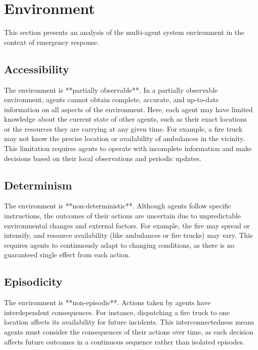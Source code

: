 \section{Environment}
\label{sec:environment}

This section presents an analysis of the multi-agent system environment in the context of emergency response. 


\subsection{Accessibility}

The environment is **partially observable**. In a partially observable environment, agents cannot obtain complete, accurate,
and up-to-date information on all aspects of the environment. Here, each agent may have limited knowledge about the current state of other agents,
such as their exact locations or the resources they are carrying at any given time. For example, a fire truck may not know the precise location or
availability of ambulances in the vicinity. This limitation requires agents to operate with incomplete information and make decisions based on their
local observations and periodic updates.

\subsection{Determinism}

The environment is **non-deterministic**. Although agents follow specific instructions, the outcomes of their actions are uncertain due to unpredictable
environmental changes and external factors. For example, the fire may spread or intensify, and resource availability (like ambulances or fire trucks) may vary.
This requires agents to continuously adapt to changing conditions, as there is no guaranteed single effect from each action.

\subsection{Episodicity}

The environment is **non-episodic**. Actions taken by agents have interdependent consequences. For instance, dispatching a fire truck to one location affects
its availability for future incidents. This interconnectedness means agents must consider the consequences of their actions over time, as each decision affects
future outcomes in a continuous sequence rather than isolated episodes.

